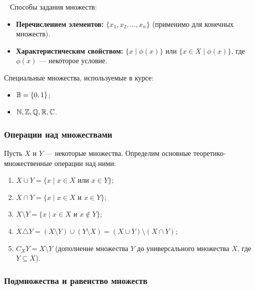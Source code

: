 \begin{remark} ~
    Способы задания множеств:
    \begin{itemize}
        \item \textbf{Перечислением элементов:} $\{x_1, x_2, \dots, x_n\}$ 
        (применимо для конечных множеств).
        \item \textbf{Характеристическим свойством:} $\{x \mid \phi(x)\}$ 
        или $\{x \in X \mid \phi(x)\}$, где $\phi(x)$ --- некоторое условие.
    \end{itemize}

    Специальные множества, используемые в курсе:
    \begin{itemize}
        \item {} $\mathbb{B} = \{0, 1\}$;
        \item {} $\mathbb{N}, \mathbb{Z}, \mathbb{Q}, \mathbb{R}, \mathbb{C}$.
    \end{itemize}
\end{remark}

\subsubsection{Операции над множествами}

\begin{definition}
    Пусть $X$ и $Y$ --- некоторые множества. Определим основные 
    теоретико-множественные операции над ними:
    \begin{enumerate}
        \item {} 
        $X \cup Y = \{x \mid x \in X \text{ или } x \in Y\}$;
        \item {} 
        $X \cap Y = \{x \mid x \in X \text{ и } x \in Y\}$;
        \item {} 
        $X \setminus Y = \{x \mid x \in X \text{ и } x \notin Y\}$;
        \item {} 
        $X \triangle Y = (X \setminus Y) \cup (Y \setminus X) = 
        (X \cup Y) \setminus (X \cap Y)$;
        \item {} 
        $C_X Y = X \setminus Y$ (дополнение множества $Y$ до универсального 
        множества $X$, где $Y \subseteq X$).
    \end{enumerate}
\end{definition}

\subsubsection{Подмножества и равенство множеств}

